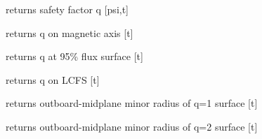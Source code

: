 \documentclass[letterpaper,10pt,english]{sphinxmanual}
\begin{document}
\begin{fulllineitems}
\begin{fulllineitems}
\label{eqtools:eqtools.EFIT.EFITTree.getQProfile}
returns safety factor q {[}psi,t{]}

\end{fulllineitems}


\begin{fulllineitems}
\label{eqtools:eqtools.EFIT.EFITTree.getQ0}
returns q on magnetic axis {[}t{]}

\end{fulllineitems}


\begin{fulllineitems}
\label{eqtools:eqtools.EFIT.EFITTree.getQ95}
returns q at 95\% flux surface {[}t{]}

\end{fulllineitems}


\begin{fulllineitems}
\label{eqtools:eqtools.EFIT.EFITTree.getQLCFS}
returns q on LCFS {[}t{]}

\end{fulllineitems}


\begin{fulllineitems}
\label{eqtools:eqtools.EFIT.EFITTree.getQ1Surf}
returns outboard-midplane minor radius of q=1 surface {[}t{]}

\end{fulllineitems}


\begin{fulllineitems}
\label{eqtools:eqtools.EFIT.EFITTree.getQ2Surf}
returns outboard-midplane minor radius of q=2 surface {[}t{]}

\end{fulllineitems}


\end{fulllineitems}
\end{document}
